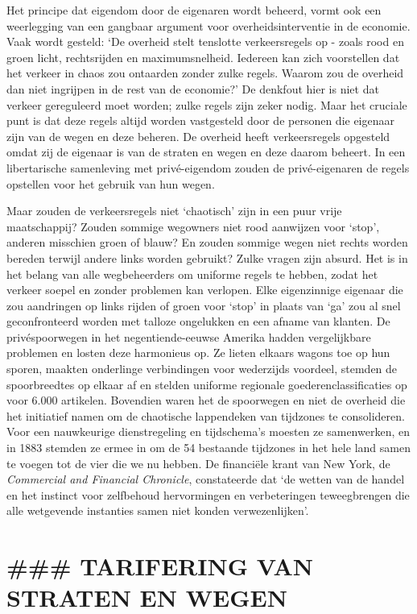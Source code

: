 \documentclass[
  a5paper,
  smalldemyvopaper,10pt,twoside,onecolumn,openright,extrafontsizes,hidelinks]{memoir}
\begin{document}
Het principe dat eigendom door de eigenaren wordt beheerd, vormt ook een
weerlegging van een gangbaar argument voor overheidsinterventie in de
economie. Vaak wordt gesteld: `De overheid stelt tenslotte
verkeersregels op - zoals rood en groen licht, rechtsrijden en
maximumsnelheid. Iedereen kan zich voorstellen dat het verkeer in chaos
zou ontaarden zonder zulke regels. Waarom zou de overheid dan niet
ingrijpen in de rest van de economie?' De denkfout hier is niet dat
verkeer gereguleerd moet worden; zulke regels zijn zeker nodig. Maar het
cruciale punt is dat deze regels altijd worden vastgesteld door de
personen die eigenaar zijn van de wegen en deze beheren. De overheid
heeft verkeersregels opgesteld omdat zij de eigenaar is van de straten
en wegen en deze daarom beheert. In een libertarische samenleving met
privé-eigendom zouden de privé-eigenaren de regels opstellen voor het
gebruik van hun wegen.

Maar zouden de verkeersregels niet `chaotisch' zijn in een puur vrije
maatschappij? Zouden sommige wegowners niet rood aanwijzen voor `stop',
anderen misschien groen of blauw? En zouden sommige wegen niet rechts
worden bereden terwijl andere links worden gebruikt? Zulke vragen zijn
absurd. Het is in het belang van alle wegbeheerders om uniforme regels
te hebben, zodat het verkeer soepel en zonder problemen kan verlopen.
Elke eigenzinnige eigenaar die zou aandringen op links rijden of groen
voor `stop' in plaats van `ga' zou al snel geconfronteerd worden met
talloze ongelukken en een afname van klanten. De privéspoorwegen in het
negentiende-eeuwse Amerika hadden vergelijkbare problemen en losten deze
harmonieus op. Ze lieten elkaars wagons toe op hun sporen, maakten
onderlinge verbindingen voor wederzijds voordeel, stemden de
spoorbreedtes op elkaar af en stelden uniforme regionale
goederenclassificaties op voor 6.000 artikelen. Bovendien waren het de
spoorwegen en niet de overheid die het initiatief namen om de chaotische
lappendeken van tijdzones te consolideren. Voor een nauwkeurige
dienstregeling en tijdschema's moesten ze samenwerken, en in 1883
stemden ze ermee in om de 54 bestaande tijdzones in het hele land samen
te voegen tot de vier die we nu hebben. De financiële krant van New
York, de \emph{Commercial and Financial Chronicle}, constateerde dat `de
wetten van de handel en het instinct voor zelfbehoud hervormingen en
verbeteringen teweegbrengen die alle wetgevende instanties samen niet
konden verwezenlijken'.

\section{\#\#\# TARIFERING VAN STRATEN EN
WEGEN}\label{tarifering-van-straten-en-wegen}
\end{document}
